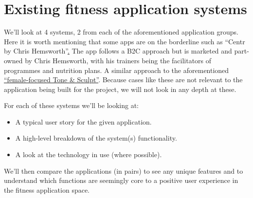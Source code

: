 \section{Existing fitness application systems}
We'll look at 4 systems, 2 from each of the aforementioned application groups. Here it is
worth mentioning that some apps are on the borderline such as
``Centr by Chris Hemsworth''\href{https://centr.com/}. The app follows a B2C approach
but is marketed and part-owned by Chris Hemsworth, with his trainers being the facilitators of programmes
and nutrition plans. A similar approach to the aforementioned
\hyperref[sec:intro_motivation]{``female-focused Tone \& Sculpt''}.
Because cases like these are not relevant to the application being built
for the project, we will not look in any depth at these.
\par
For each of these systems we'll be looking at:
\begin{itemize}
	\item A typical user story for the given application.
	\item A high-level breakdown of the system(s) functionality.
	\item A look at the technology in use (where possible).
\end{itemize}
We'll then compare the applications (in pairs) to see any unique features
and to understand which functions are seemingly core to a positive user experience
in the fitness application space.

